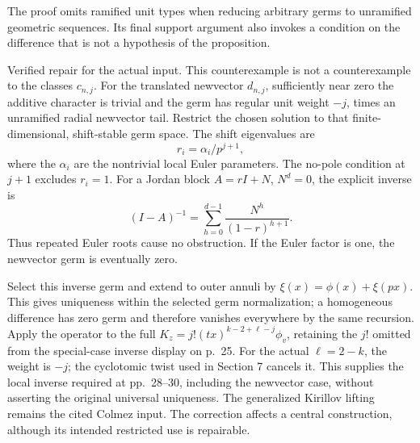 \documentclass[10pt]{article}
\begin{document}
The proof omits ramified unit types when reducing arbitrary germs to unramified geometric sequences. Its final support argument also invokes a condition on the difference that is not a hypothesis of the proposition.\par
Verified repair for the actual input. This counterexample is not a counterexample to the classes \(c_{n,j}\). For the translated newvector \(d_{n,j}\), sufficiently near zero the additive character is trivial and the germ has regular unit weight \(-j\), times an unramified radial newvector tail. Restrict the chosen solution to that finite-dimensional, shift-stable germ space. The shift eigenvalues are \[r_i=\alpha_i/p^{j+1},\] where the \(\alpha_i\) are the nontrivial local Euler parameters. The no-pole condition at \(j+1\) excludes \(r_i=1\). For a Jordan block \(A=rI+N\), \(N^d=0\), the explicit inverse is \[(I-A)^{-1}=\sum_{h=0}^{d-1}\frac{N^h}{(1-r)^{h+1}}.\] Thus repeated Euler roots cause no obstruction. If the Euler factor is one, the newvector germ is eventually zero.\par
Select this inverse germ and extend to outer annuli by \(\xi(x)=\phi(x)+\xi(px)\). This gives uniqueness within the selected germ normalization; a homogeneous difference has zero germ and therefore vanishes everywhere by the same recursion. Apply the operator to the full \(K_z=j!(tx)^{k-2+\ell-j}\phi_v\), retaining the \(j!\) omitted from the special-case inverse display on p. 25. For the actual \(\ell=2-k\), the weight is \(-j\); the cyclotomic twist used in Section 7 cancels it. This supplies the local inverse required at pp. 28–30, including the newvector case, without asserting the original universal uniqueness. The generalized Kirillov lifting remains the cited Colmez input. The correction affects a central construction, although its intended restricted use is repairable.\par
\end{document}
